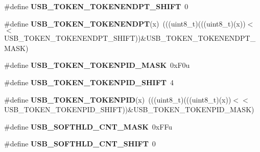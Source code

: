 \begin{DoxyCompactItemize}
\item 
\#define {\bfseries U\+S\+B\+\_\+\+T\+O\+K\+E\+N\+\_\+\+T\+O\+K\+E\+N\+E\+N\+D\+P\+T\+\_\+\+S\+H\+I\+FT}~0\hypertarget{group__USB__Register__Masks_ga08c6b329c95f8ac5a39eecfbd347cce2}{}\label{group__USB__Register__Masks_ga08c6b329c95f8ac5a39eecfbd347cce2}

\item 
\#define {\bfseries U\+S\+B\+\_\+\+T\+O\+K\+E\+N\+\_\+\+T\+O\+K\+E\+N\+E\+N\+D\+PT}(x)~(((uint8\+\_\+t)(((uint8\+\_\+t)(x))$<$$<$U\+S\+B\+\_\+\+T\+O\+K\+E\+N\+\_\+\+T\+O\+K\+E\+N\+E\+N\+D\+P\+T\+\_\+\+S\+H\+I\+FT))\&U\+S\+B\+\_\+\+T\+O\+K\+E\+N\+\_\+\+T\+O\+K\+E\+N\+E\+N\+D\+P\+T\+\_\+\+M\+A\+SK)\hypertarget{group__USB__Register__Masks_ga7ac5c83cc884b69828af1c56818e46ab}{}\label{group__USB__Register__Masks_ga7ac5c83cc884b69828af1c56818e46ab}

\item 
\#define {\bfseries U\+S\+B\+\_\+\+T\+O\+K\+E\+N\+\_\+\+T\+O\+K\+E\+N\+P\+I\+D\+\_\+\+M\+A\+SK}~0x\+F0u\hypertarget{group__USB__Register__Masks_ga8880174ec35cfb684d2bcc6e0d5a52bc}{}\label{group__USB__Register__Masks_ga8880174ec35cfb684d2bcc6e0d5a52bc}

\item 
\#define {\bfseries U\+S\+B\+\_\+\+T\+O\+K\+E\+N\+\_\+\+T\+O\+K\+E\+N\+P\+I\+D\+\_\+\+S\+H\+I\+FT}~4\hypertarget{group__USB__Register__Masks_gae410fcf426d2212be6468703734f6ed9}{}\label{group__USB__Register__Masks_gae410fcf426d2212be6468703734f6ed9}

\item 
\#define {\bfseries U\+S\+B\+\_\+\+T\+O\+K\+E\+N\+\_\+\+T\+O\+K\+E\+N\+P\+ID}(x)~(((uint8\+\_\+t)(((uint8\+\_\+t)(x))$<$$<$U\+S\+B\+\_\+\+T\+O\+K\+E\+N\+\_\+\+T\+O\+K\+E\+N\+P\+I\+D\+\_\+\+S\+H\+I\+FT))\&U\+S\+B\+\_\+\+T\+O\+K\+E\+N\+\_\+\+T\+O\+K\+E\+N\+P\+I\+D\+\_\+\+M\+A\+SK)\hypertarget{group__USB__Register__Masks_ga74fd206a0132343b30c41a2184f18ea0}{}\label{group__USB__Register__Masks_ga74fd206a0132343b30c41a2184f18ea0}

\item 
\#define {\bfseries U\+S\+B\+\_\+\+S\+O\+F\+T\+H\+L\+D\+\_\+\+C\+N\+T\+\_\+\+M\+A\+SK}~0x\+F\+Fu\hypertarget{group__USB__Register__Masks_gab71f8a7be8b025453facbce8d45b7bcc}{}\label{group__USB__Register__Masks_gab71f8a7be8b025453facbce8d45b7bcc}

\item 
\#define {\bfseries U\+S\+B\+\_\+\+S\+O\+F\+T\+H\+L\+D\+\_\+\+C\+N\+T\+\_\+\+S\+H\+I\+FT}~0\hypertarget{group__USB__Register__Masks_gaf4b663b6276ba642abfdedf79fac92c6}{}\label{group__USB__Register__Masks_gaf4b663b6276ba642abfdedf79fac92c6}


\end{DoxyCompactItemize}
